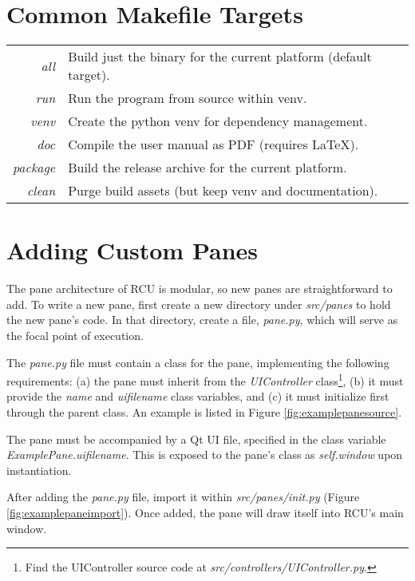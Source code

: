 \section{Common Makefile Targets}
\label{sec:makefile}

\begin{tabular}{ r | l }
  \textit{all} & Build just the binary for the current platform (default target). \\
  \textit{run} & Run the program from source within venv. \\
  \textit{venv} & Create the python venv for dependency management. \\
  \textit{doc} & Compile the user manual as PDF (requires \LaTeX). \\
  \textit{package} & Build the release archive for the current platform. \\
  \textit{clean} & Purge build assets (but keep venv and documentation). \\
\end{tabular}




\section{Adding Custom Panes}
\label{sec:devcustompanes}
The pane architecture of RCU is modular, so new panes are straightforward to add. To write a new pane, first create a new directory under \textit{src/panes} to hold the new pane's code. In that directory, create a file, \textit{pane.py}, which will serve as the focal point of execution.

The \textit{pane.py} file must contain a class for the pane, implementing the following requirements: (a) the pane must inherit from the \textit{UIController} class\footnote{\raggedleft Find the \linebreak UIController source code at \textit{src/controllers/UIController.py}.}, (b) it must provide the \textit{name} and \textit{ui\textunderscore filename} class variables, and (c) it must initialize first through the parent class. An example is listed in Figure \ref{fig:examplepanesource}.

The pane must be accompanied by a Qt UI file, specified in the class variable \linebreak\textit{ExamplePane.ui\textunderscore filename}. This is exposed to the pane's class as \textit{self.window} upon instantiation.

After adding the \textit{pane.py} file, import it within \textit{src/panes/\textunderscore \textunderscore init\textunderscore \textunderscore.py} (Figure \ref{fig:examplepaneimport}). Once added, the pane will draw itself into RCU's main window.

